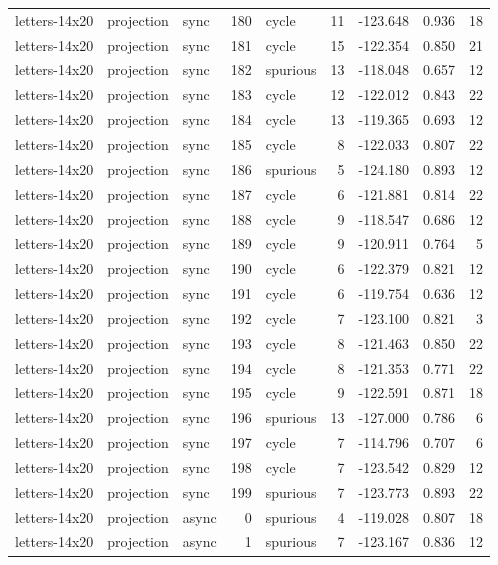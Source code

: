 \begin{tabular}{lllrlrrrr}
letters-14x20 & projection & sync & 180 & cycle & 11 & -123.648 & 0.936 & 18 \\
letters-14x20 & projection & sync & 181 & cycle & 15 & -122.354 & 0.850 & 21 \\
letters-14x20 & projection & sync & 182 & spurious & 13 & -118.048 & 0.657 & 12 \\
letters-14x20 & projection & sync & 183 & cycle & 12 & -122.012 & 0.843 & 22 \\
letters-14x20 & projection & sync & 184 & cycle & 13 & -119.365 & 0.693 & 12 \\
letters-14x20 & projection & sync & 185 & cycle & 8 & -122.033 & 0.807 & 22 \\
letters-14x20 & projection & sync & 186 & spurious & 5 & -124.180 & 0.893 & 12 \\
letters-14x20 & projection & sync & 187 & cycle & 6 & -121.881 & 0.814 & 22 \\
letters-14x20 & projection & sync & 188 & cycle & 9 & -118.547 & 0.686 & 12 \\
letters-14x20 & projection & sync & 189 & cycle & 9 & -120.911 & 0.764 & 5 \\
letters-14x20 & projection & sync & 190 & cycle & 6 & -122.379 & 0.821 & 12 \\
letters-14x20 & projection & sync & 191 & cycle & 6 & -119.754 & 0.636 & 12 \\
letters-14x20 & projection & sync & 192 & cycle & 7 & -123.100 & 0.821 & 3 \\
letters-14x20 & projection & sync & 193 & cycle & 8 & -121.463 & 0.850 & 22 \\
letters-14x20 & projection & sync & 194 & cycle & 8 & -121.353 & 0.771 & 22 \\
letters-14x20 & projection & sync & 195 & cycle & 9 & -122.591 & 0.871 & 18 \\
letters-14x20 & projection & sync & 196 & spurious & 13 & -127.000 & 0.786 & 6 \\
letters-14x20 & projection & sync & 197 & cycle & 7 & -114.796 & 0.707 & 6 \\
letters-14x20 & projection & sync & 198 & cycle & 7 & -123.542 & 0.829 & 12 \\
letters-14x20 & projection & sync & 199 & spurious & 7 & -123.773 & 0.893 & 22 \\
letters-14x20 & projection & async & 0 & spurious & 4 & -119.028 & 0.807 & 18 \\
letters-14x20 & projection & async & 1 & spurious & 7 & -123.167 & 0.836 & 12 \\

\end{tabular}
